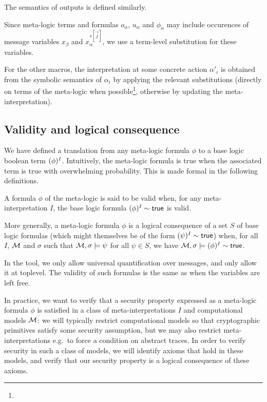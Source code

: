 The semantics of outputs is defined similarly.

Since meta-logic terms and formulas $o_{\alpha}$, $u_{\alpha}$ and
$\phi_{\alpha}$ may include occurences of message variables
$x_\beta$ and $x_{\alpha}^{s[\vec{j}]}$,
we use a term-level substitution for these variables.



    For the other macros, the interpretation at some concrete
    action $\alpha'_i$ is obtained from the symbolic semantics of
    $\alpha_i$ by applying the relevant substitutions (directly
    on terms of the meta-logic when possible\footnote{
    }, otherwise by updating the meta-interpretation).


\subsection{Validity and logical consequence}

We have defined a translation from any meta-logic formula $\phi$
to a base logic boolean term $(\phi)^I$. Intuitively, the
meta-logic formula is true when the associated term is true with
overwhelming probability. This is made formal in the following
definitions.

\begin{definition}
  A formula $\phi$ of the meta-logic is said to be valid when,
  for any meta-interpretation $I$, the base logic formula
  $(\phi)^{I} \sim \textsf{true}$ is valid.

  More generally, a meta-logic formula $\phi$ is a
  logical consequence of a set $S$ of base logic formulas
  (which might themselves be of the form $(\psi)^I \sim \textsf{true}$)
  when, for all $I$, $\mathcal{M}$ and $\sigma$ such that
  $\mathcal{M},\sigma \models \psi$ for all $\psi\in S$,
  we have
  $\mathcal{M},\sigma \models(\phi)^{I}\sim\mathsf{true}$.
\end{definition}

\begin{remark}
  In the tool, we only allow universal quantification over messages, and
  only allow it at toplevel. The validity of such formulas is the same as
  when the variables are left free.
\end{remark}

In practice, we want to verify that a security property expressed as a
meta-logic formula $\phi$ is satisfied in a class of meta-interpretations
$I$ and computational models $\mathcal{M}$: we will typically restrict computational
models so that cryptographic primitives satisfy some security assumption,
but we may also restrict meta-interpretations e.g.\ to force a condition on
abstract traces. In order to verify security in such a class of models,
we will identify axioms that hold in these models, and verify that our
security property is a logical consequence of these axioms.


